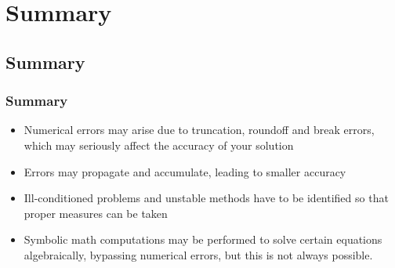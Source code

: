  
\section{Summary}
\subsection*{Summary}
\begin{frame}
  \frametitle{Summary}
  \begin{itemize}
     \item Numerical errors may arise due to truncation, roundoff and break errors, which may seriously affect the accuracy of your solution
     \item Errors may propagate and accumulate, leading to smaller accuracy
     \item Ill-conditioned problems and unstable methods have to be identified so that proper measures can be taken
     \item Symbolic math computations may be performed to solve certain equations algebraically, bypassing numerical errors, but this is not always possible.
  \end{itemize}

\end{frame}



